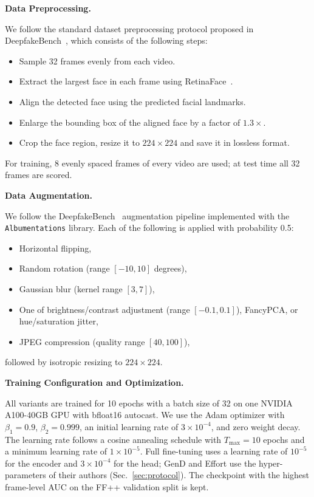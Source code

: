 \documentclass[fonts]{icst}
\begin{document}
\noindent\textbf{Data Preprocessing.}\par
We follow the standard dataset preprocessing protocol proposed in DeepfakeBench~\cite{yan2023deepfakebench}, which consists of the following steps:
\begin{itemize}[leftmargin=*, topsep=2pt, itemsep=2pt, label=--]
    \item Sample 32 frames evenly from each video.
    \item Extract the largest face in each frame using RetinaFace~\cite{deng2020retinaface}.
    \item Align the detected face using the predicted facial landmarks.
    \item Enlarge the bounding box of the aligned face by a factor of $1.3\times$.
    \item Crop the face region, resize it to $224 \times 224$ and save it in lossless format.
\end{itemize}
For training, 8 evenly spaced frames of every video are used; at test time all 32 frames are scored.

\noindent\textbf{Data Augmentation.}\par
We follow the DeepfakeBench~\cite{yan2023deepfakebench} augmentation pipeline implemented with the \texttt{Albumentations} library. Each of the following is applied with probability 0.5:
\begin{itemize}[leftmargin=*, topsep=2pt, itemsep=2pt, label=--]
    \item Horizontal flipping,
    \item Random rotation (range $[-10, 10]$ degrees),
    \item Gaussian blur (kernel range $[3, 7]$),
    \item One of brightness/contrast adjustment (range $[-0.1, 0.1]$), FancyPCA, or hue/saturation jitter,
    \item JPEG compression (quality range $[40, 100]$),
\end{itemize}
followed by isotropic resizing to $224\times224$.

\noindent\textbf{Training Configuration and Optimization.}\par
All variants are trained for 10 epochs with a batch size of 32 on one NVIDIA A100-40GB GPU with bfloat16 autocast.
We use the Adam optimizer with $\beta_1 = 0.9$, $\beta_2 = 0.999$, an initial learning rate of $3 \times 10^{-4}$, and zero weight decay.
The learning rate follows a cosine annealing schedule with $T_{\max}=10$ epochs and a minimum learning rate of $1 \times 10^{-5}$.
Full fine-tuning uses a learning rate of $10^{-5}$ for the encoder and $3\times10^{-4}$ for the head; GenD and Effort use the hyper-parameters of their authors (Sec.~\ref{sec:protocol}). The checkpoint with the highest frame-level AUC on the FF++ validation split is kept.
\end{document}
